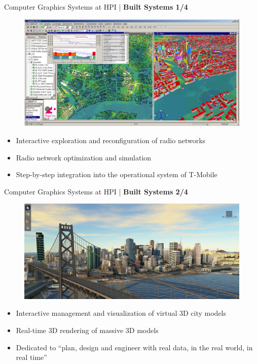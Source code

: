 \begin{frame}{Computer Graphics Systems at HPI | \textbf{Built Systems 1/4}}

	\begin{figure}
		\raggedright
		\includegraphics[height=0.32\textwidth]{images/pegaplan.jpg}
	\end{figure}
	
	
	\begin{itemize}
		\item Interactive exploration and reconfiguration of radio networks
		\item Radio network optimization and simulation
		\item Step-by-step integration into the operational system of T-Mobile
	\end{itemize}
	
\end{frame}


\begin{frame}{Computer Graphics Systems at HPI | \textbf{Built Systems 2/4}}

	\begin{figure}
		\raggedright
		\includegraphics[height=0.32\textwidth]{images/infraworks}
	\end{figure}
	

	\begin{itemize}
		\item Interactive management and visualization of virtual 3D city models
		\item Real-time 3D rendering of massive 3D models
		\item Dedicated to \enquote{plan, design and engineer with real data, in the real world, in real time}
	\end{itemize}
	
\end{frame}


